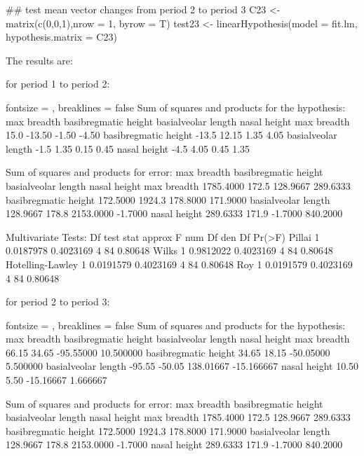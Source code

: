 \documentclass{article}
\begin{document}
\begin{enumerate}[leftmargin = 0 em, label = \arabic*., font = \bfseries]
\begin{enumerate}
\begin{rcode}
## test mean vector changes from period 2 to period 3
C23 <- matrix(c(0,0,1),nrow = 1, byrow = T)
test23 <- linearHypothesis(model = fit.lm, hypothesis.matrix = C23)
\end{rcode}
The results are:

for period 1 to period 2:
\begin{rcode*}{fontsize = \footnotesize, breaklines = false}
Sum of squares and products for the hypothesis:
                     max breadth basibregmatic height basialveolar length nasal height
max breadth                 15.0               -13.50               -1.50        -4.50
basibregmatic height       -13.5                12.15                1.35         4.05
basialveolar length         -1.5                 1.35                0.15         0.45
nasal height                -4.5                 4.05                0.45         1.35

Sum of squares and products for error:
                     max breadth basibregmatic height basialveolar length nasal height
max breadth            1785.4000                172.5            128.9667     289.6333
basibregmatic height    172.5000               1924.3            178.8000     171.9000
basialveolar length     128.9667                178.8           2153.0000      -1.7000
nasal height            289.6333                171.9             -1.7000     840.2000

Multivariate Tests: 
                 Df test stat  approx F num Df den Df  Pr(>F)
Pillai            1 0.0187978 0.4023169      4     84 0.80648
Wilks             1 0.9812022 0.4023169      4     84 0.80648
Hotelling-Lawley  1 0.0191579 0.4023169      4     84 0.80648
Roy               1 0.0191579 0.4023169      4     84 0.80648
\end{rcode*}

for period 2 to period 3:
\begin{rcode*}{fontsize = \footnotesize, breaklines = false}
Sum of squares and products for the hypothesis:
                     max breadth basibregmatic height basialveolar length nasal height
max breadth                66.15                34.65           -95.55000    10.500000
basibregmatic height       34.65                18.15           -50.05000     5.500000
basialveolar length       -95.55               -50.05           138.01667   -15.166667
nasal height               10.50                 5.50           -15.16667     1.666667

Sum of squares and products for error:
                     max breadth basibregmatic height basialveolar length nasal height
max breadth            1785.4000                172.5            128.9667     289.6333
basibregmatic height    172.5000               1924.3            178.8000     171.9000
basialveolar length     128.9667                178.8           2153.0000      -1.7000
nasal height            289.6333                171.9             -1.7000     840.2000


\end{rcode*}
\end{enumerate}
\end{enumerate}
\end{document}
